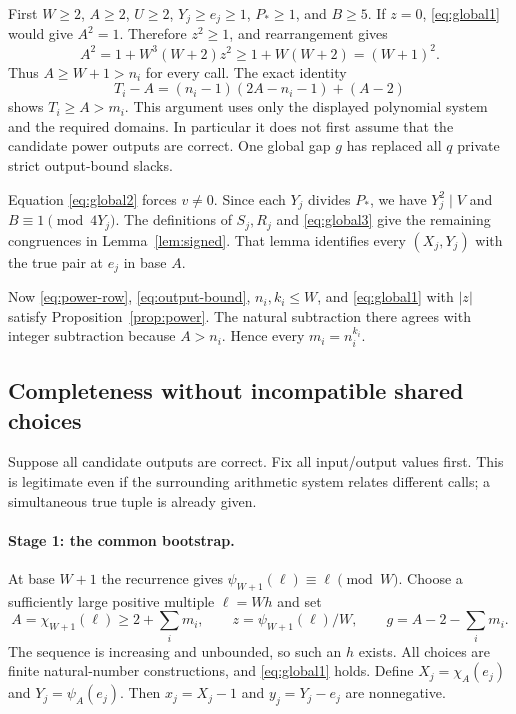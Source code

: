 \documentclass[11pt]{article}
\theoremstyle{definition}
\theoremstyle{remark}
\begin{document}
First $W\ge2$, $A\ge2$, $U\ge2$, $Y_j\ge e_j\ge1$,
$P_*\ge1$, and $B\ge5$. If $z=0$, \eqref{eq:global1} would give
$A^2=1$. Therefore $z^2\ge1$, and rearrangement gives
\[
 A^2=1+W^3(W+2)z^2\ge1+W(W+2)=(W+1)^2.
\]
Thus $A\ge W+1>n_i$ for every call. The exact identity
\begin{equation}\label{eq:output-bound}
 T_i-A=(n_i-1)(2A-n_i-1)+(A-2)
\end{equation}
shows $T_i\ge A>m_i$. This argument uses only the displayed polynomial
system and the required domains. In particular it does not first assume
that the candidate power outputs are correct. One global gap $g$ has
replaced all $q$ private strict output-bound slacks.

Equation \eqref{eq:global2} forces $v\ne0$. Since each $Y_j$ divides
$P_*$, we have $Y_j^2\mid V$ and $B\equiv1\pmod{4Y_j}$.
The definitions of $S_j,R_j$ and \eqref{eq:global3} give the remaining
congruences in Lemma~\ref{lem:signed}. That lemma identifies every
$(X_j,Y_j)$ with the true pair at $e_j$ in base $A$.

Now \eqref{eq:power-row}, \eqref{eq:output-bound}, $n_i,k_i\le W$,
and \eqref{eq:global1} with $|z|$ satisfy
Proposition~\ref{prop:power}. The natural subtraction there agrees
with integer subtraction because $A>n_i$. Hence every $m_i=n_i^{k_i}$.

\subsection{Completeness without incompatible shared choices}

Suppose all candidate outputs are correct. Fix all input/output values
first. This is legitimate even if the surrounding arithmetic system
relates different calls; a simultaneous true tuple is already given.

\paragraph{Stage 1: the common bootstrap.}
At base $W+1$ the recurrence gives
$\psi_{W+1}(\ell)\equiv\ell\pmod W$.
Choose a sufficiently large positive multiple $\ell=Wh$ and set
\[
 A=\chi_{W+1}(\ell)\ge2+\sum_i m_i,\qquad
 z=\psi_{W+1}(\ell)/W,\qquad
 g=A-2-\sum_i m_i.
\]
The sequence is increasing and unbounded, so such an $h$ exists.
All choices are finite natural-number constructions, and
\eqref{eq:global1} holds. Define
$X_j=\chi_A(e_j)$ and $Y_j=\psi_A(e_j)$.
Then $x_j=X_j-1$ and $y_j=Y_j-e_j$ are nonnegative.
\end{document}
